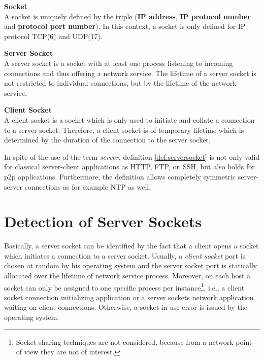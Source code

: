 \parbox{
\textwidth}{
\begin{defn}
	{\textbf{Socket}\\} A socket is uniquely defined by the triple (\textbf{IP address}, \textbf{IP protocol number} and \textbf{protocol port number}). In this context, a socket is only defined for IP protocol \gls{TCP}(6) and \gls{UDP}(17).
\end{defn}
}
\parbox{
\textwidth}{
\begin{defn}
	{\textbf{Server Socket
	\label{def:serversocket}}\\} A server socket is a socket with at least one process listening to incoming connections and thus offering a network service. The lifetime of a server socket is not restricted to individual connections, but by the lifetime of the network service.
\end{defn}
}

\parbox{
\textwidth}{
\begin{defn}
	{\textbf{Client Socket}\\} A client socket is a socket which is only used to initiate and collate a connection to a server socket. Therefore, a client	socket is of temporary lifetime which is determined by the duration of the 	connection to the server socket.
\end{defn}
}

In spite of the use of the term \emph{server}, definition \ref{def:serversocket} is not only valid for classical server-client applications as \gls{HTTP}, \gls{FTP}, or \gls{SSH}, but also holds for \gls{p2p} applications. Furthermore, the definition allows completely symmetric server-server connections as for example \gls{NTP} as well.


\section{Detection of Server Sockets
\label{section:socket_detection}}

Basically, a \gls{server socket} can be identified by the fact that a client opens a socket which initiates a connection to a \gls{server socket}. Usually, a \emph{client socket} port is chosen at random by his operating system and the \gls{server socket} port is statically allocated over the lifetime of network service process. Moreover, on each host a socket can only be assigned to one specific process per instance\footnote{Socket sharing techniques are not considered, because from a network point of view they are not of interest.}, i.e., a client socket connection initializing application or a \glspl{server socket} network application waiting on client connections. Otherwise, a socket-in-use-error is issued by the operating system\citep{Schatzmann:Dissection}.

